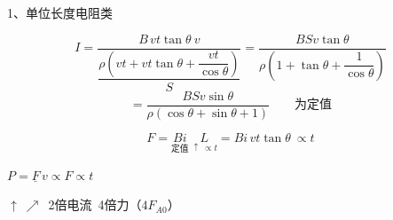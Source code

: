 1、单位长度电阻类


\[
I=\frac{B\,vt\tan\theta\ v}{\dfrac{\rho\left(vt+vt\tan\theta+\dfrac{vt}{\cos\theta}\right)}{S}}
=\frac{BSv\tan\theta}{\rho\left(1+\tan\theta+\dfrac{1}{\cos\theta}\right)}
\]
\[
=\frac{BSv\sin\theta}{\rho(\cos\theta+\sin\theta+1)}\qquad\text{为定值}
\]

\[
F=\underset{\text{定值}}{Bi}\ \underset{\uparrow\ \propto t}{L}=Bi\,vt\tan\theta\ \propto t
\]


\qquad $P=\underline{F}\,v\propto F\propto t$


$\uparrow\ \nearrow$\ 2倍电流\ 4倍力（$4F_{A0}$）
